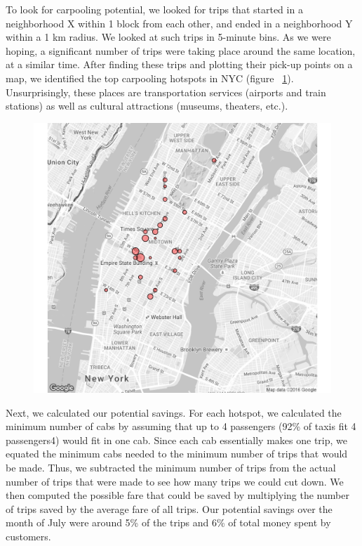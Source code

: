 \documentclass[twocolumn]{article}
\begin{document}
To look for carpooling potential, we looked for trips that started in a neighborhood X within 1 block from each other, and ended in a neighborhood Y within a 1 km radius. We looked at such trips in 5-minute bins. As we were hoping, a significant number of trips were taking place around the same location, at a similar time. After finding these trips and plotting their pick-up points on a map, we identified the top carpooling hotspots in NYC (figure ~\ref{fig:hotspots}). Unsurprisingly, these places are transportation services (airports and train stations) as well as cultural attractions (museums, theaters, etc.). 
\begin{figure}[h]
  \centering
  \includegraphics[width=.9\linewidth]{top_25_hotspots}
  \label{fig:hotspots}
\end{figure}

Next, we calculated our potential savings. For each hotspot, we calculated the minimum number of cabs by assuming that up to 4 passengers (92\% of taxis fit 4 passengers4) would fit in one cab. Since each cab essentially makes one trip, we equated the minimum cabs needed to the minimum number of trips that would be made. Thus, we subtracted the minimum number of trips from the actual number of trips that were made to see how many trips we could cut down. We then computed the possible fare that could be saved by multiplying the number of trips saved by the average fare of all trips. Our potential savings over the month of July were around 5\% of the trips and 6\% of total money spent by customers.
\end{document}
